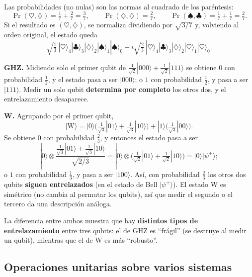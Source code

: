 \documentclass[11pt, a4paper, twoside, openright]{report}
\begin{document}
\begin{tcolorbox}[colback=cyan!5!white,colframe=cyan!75!black,title=\textbf{Ejemplo: Medición parcial de cinco sistemas}]
\begin{align*}
\end{align*}
Las probabilidades (no nulas) son las normas al cuadrado de los paréntesis:
\[ \Pr(\heartsuit,\diamondsuit) = \tfrac17 + \tfrac27 = \tfrac37, \qquad \Pr(\diamondsuit,\diamondsuit) = \tfrac27, \qquad \Pr(\spadesuit,\clubsuit) = \tfrac17 + \tfrac17 = \tfrac27. \]
Si el resultado es $(\heartsuit,\diamondsuit)$, se normaliza dividiendo por $\sqrt{3/7}$ y, volviendo al orden original, el estado queda
\[ \sqrt{\tfrac13}\,|\heartsuit\rangle_4|\clubsuit\rangle_3|\diamondsuit\rangle_2|\spadesuit\rangle_1|\spadesuit\rangle_0 - i\sqrt{\tfrac23}\,|\heartsuit\rangle_4|\clubsuit\rangle_3|\diamondsuit\rangle_2|\heartsuit\rangle_1|\heartsuit\rangle_0. \]
\end{tcolorbox}

\begin{tcolorbox}[colback=cyan!5!white,colframe=cyan!75!black,title=\textbf{Ejemplo: Medir un qubit de los estados GHZ y W}]
\textbf{GHZ.} Midiendo solo el primer qubit de $\frac{1}{\sqrt2}|000\rangle + \frac{1}{\sqrt2}|111\rangle$ se obtiene $0$ con probabilidad $\frac12$, y el estado pasa a ser $|000\rangle$; o $1$ con probabilidad $\frac12$, y pasa a ser $|111\rangle$. Medir un solo qubit \textbf{determina por completo} los otros dos, y el entrelazamiento desaparece.

\textbf{W.} Agrupando por el primer qubit,
\[ |\mathrm{W}\rangle = |0\rangle\Big(\tfrac{1}{\sqrt3}|01\rangle + \tfrac{1}{\sqrt3}|10\rangle\Big) + |1\rangle\Big(\tfrac{1}{\sqrt3}|00\rangle\Big). \]
Se obtiene $0$ con probabilidad $\frac23$, y entonces el estado pasa a ser
\[ |0\rangle\otimes\frac{\frac{1}{\sqrt3}|01\rangle + \frac{1}{\sqrt3}|10\rangle}{\sqrt{2/3}} = |0\rangle\otimes\Big(\tfrac{1}{\sqrt2}|01\rangle + \tfrac{1}{\sqrt2}|10\rangle\Big) = |0\rangle|\psi^+\rangle; \]
o $1$ con probabilidad $\frac13$, y pasa a ser $|100\rangle$. Así, con probabilidad $\frac23$ los otros dos qubits \textbf{siguen entrelazados} (en el estado de Bell $|\psi^+\rangle$). El estado W es simétrico (no cambia al permutar los qubits), así que medir el segundo o el tercero da una descripción análoga.

La diferencia entre ambos muestra que hay \textbf{distintos tipos de entrelazamiento} entre tres qubits: el de GHZ es ``frágil'' (se destruye al medir un qubit), mientras que el de W es más ``robusto''.
\end{tcolorbox}

\subsection{Operaciones unitarias sobre varios sistemas}
\end{document}
